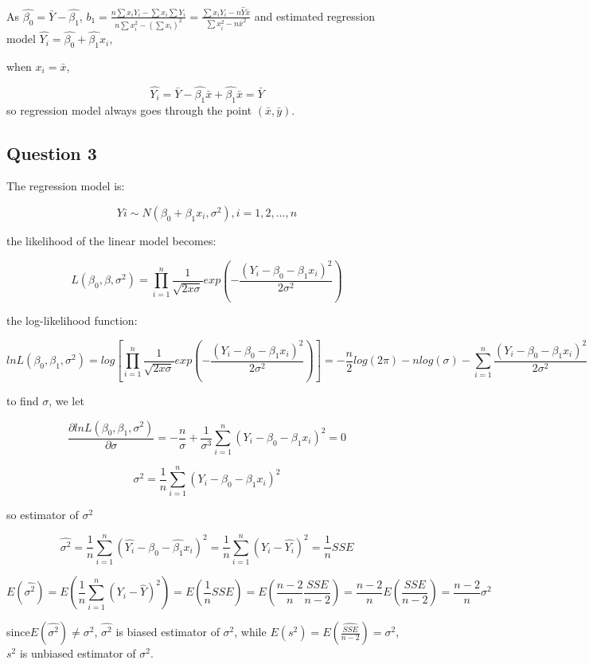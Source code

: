 \documentclass[]{article}
\begin{document}
As \(\hat{\beta_0}=\bar{Y}-\hat{\beta_1}\),
\(b_1 = \frac{n\sum x_iY_i-\sum x_i\sum Y_i}{n\sum x^2_i-(\sum x_i)^2} = \frac{\sum x_iY_i-n\hat{Y}\bar{x}}{\sum x_i^2 - n\bar{x}^2}\)
and estimated regression model
\(\hat{Y_i}=\hat{\beta_0}+\hat{\beta_1}x_i\),

when \(x_i=\bar{x}\),

\[\hat{Y_i}=\bar{Y}-\hat{\beta_1}\bar{x}+\hat{\beta_1}\bar{x}=\bar{Y}\]
so regression model always goes through the point \((\bar{x},\bar{y})\).

\subsection{Question 3}\label{question-3}

The regression model is:

\[ Yi \sim N(\beta_0 + \beta_1x_i, \sigma^2), i=1, 2, ..., n \]

the likelihood of the linear model becomes:

\[ L(\beta_0, \beta, \sigma^2) = \prod_{i=1}^n\frac{1}{\sqrt{2x\sigma}}exp(-\frac{(Y_i-\beta_0-\beta_1x_i)^2}{2\sigma^2}) \]

the log-likelihood function:

\[ lnL(\beta_0, \beta_1, \sigma^2) = log[\prod_{i=1}^n\frac{1}{\sqrt{2x\sigma}}exp(-\frac{(Y_i-\beta_0-\beta_1x_i)^2}{2\sigma^2})] = -\frac{n}{2}log(2\pi)-nlog(\sigma)-\sum_{i=1}^n\frac{(Y_i -\beta_0-\beta_1x_i)^2}{2\sigma^2} \]

to find \(\sigma\), we let

\[ \frac{\partial{lnL(\beta_0, \beta_1, \sigma^2)}}{\partial{\sigma}}= -\frac{n}{\sigma}+\frac{1}{\sigma^3}\sum_{i=1}^n(Y_i-\beta_0-\beta_1x_i)^2=0 \]

\[ \sigma^2 = \frac{1}{n}\sum_{i=1}^n(Y_i-\beta_0-\beta_1x_i)^2 \]

so estimator of \(\sigma^2\)

\[  \hat{\sigma^2} = \frac{1}{n}\sum_{i=1}^n(\hat{Y_i}-\hat{\beta_0}-\hat{\beta_1}x_i)^2 = \frac{1}{n}\sum_{i=1}^n(Y_i-\hat{Y_i})^2 = \frac{1}{n}SSE\]

\[ E(\hat{\sigma^2}) = E(\frac{1}{n}\sum_{i=1}^n(Y_i-\hat{Y})^2) = E(\frac{1}{n}SSE) = E(\frac{n-2}{n}\frac{SSE}{n-2}) = \frac{n-2}{n}E(\frac{SSE}{n-2}) = \frac{n-2}{n}\sigma^2 \]

since\(E(\hat{\sigma^2}) \neq \sigma^2\), \(\hat{\sigma^2}\) is biased
estimator of \(\sigma^2\), while
\(E(s^2) = E(\hat{\frac{SSE}{n-2}}) = \sigma^2\), \(s^2\) is unbiased
estimator of \(\sigma^2\).
\end{document}

